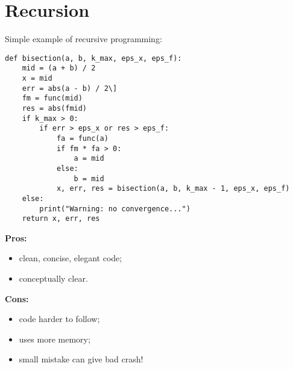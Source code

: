 \documentclass{article}
\begin{document}
\clearpage

\section*{Recursion}

Simple example of recursive programming:

\begin{verbatim}
def bisection(a, b, k_max, eps_x, eps_f):
	mid = (a + b) / 2
	x = mid
	err = abs(a - b) / 2\]
	fm = func(mid)
	res = abs(fmid)
	if k_max > 0:
		if err > eps_x or res > eps_f:
			fa = func(a)
			if fm * fa > 0:
				a = mid
			else:
				b = mid
			x, err, res = bisection(a, b, k_max - 1, eps_x, eps_f)
	else:
		print("Warning: no convergence...")
	return x, err, res
\end{verbatim}

\textbf{Pros:}
\begin{itemize}
	\item clean, concise, elegant code;
	\item conceptually clear.
\end{itemize}

\textbf{Cons:}
\begin{itemize}
	\item code harder to follow;
	\item uses more memory;
	\item small mistake can give bad crash! 
\end{itemize}
\end{document}
